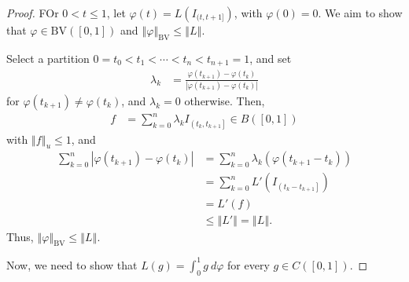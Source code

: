 \documentclass[12pt]{extarticle}
\newcommand{\norm}[1]{\left\Vert #1\right\Vert}
\theoremstyle{plain}
\theoremstyle{definition}
\theoremstyle{note}
\renewcommand{\newline}{\hfill\break}
\begin{document}
\begin{proof}
  FOr $0 < t \leq 1$, let $\varphi(t) = L\left(I_{(t,t+1]}\right)$, with $\varphi(0) = 0$. We aim to show that $\varphi \in \text{BV}\left([0,1]\right)$ and $\norm{\varphi}_{\text{BV}} \leq \norm{L}$.\newline

  Select a partition $0 = t_0 < t_1 < \cdots < t_n < t_{n+1} = 1$, and set
  \begin{align*}
    \lambda_k &= \frac{\varphi\left(t_{k+1}\right) - \varphi\left(t_{k}\right)}{\left\vert \varphi\left(t_{k+1}\right) - \varphi\left(t_k\right) \right\vert}
  \end{align*}
  for $\varphi\left(t_{k+1}\right) \neq \varphi\left(t_k\right)$, and $\lambda_k = 0$ otherwise. Then,
  \begin{align*}
    f &= \sum_{k=0}^{n}\lambda_k I_{\left(t_{k},t_{k+1}\right]} \in B\left([0,1]\right)
  \end{align*}
  with $\norm{f}_{u} \leq 1$, and
  \begin{align*}
    \sum_{k=0}^{n}\left\vert \varphi\left(t_{k+1}\right) - \varphi\left(t_{k}\right) \right\vert &= \sum_{k=0}^{n}\lambda_k\left(\varphi\left(t_{k+1} - t_k\right)\right)\\
       &= \sum_{k=0}^{n}L'\left(I_{\left(t_k - t_{k+1}\right]}\right)\\
           &= L'(f)\\
                             &\leq \norm{L'} = \norm{L}.
  \end{align*}
  Thus, $\norm{\varphi}_{\text{BV}} \leq \norm{L}$.\newline

  Now, we need to show that $L(g) = \int_{0}^{1} g\:d\varphi$ for every $g\in C\left([0,1]\right)$.\newline


\end{proof}
\end{document}
